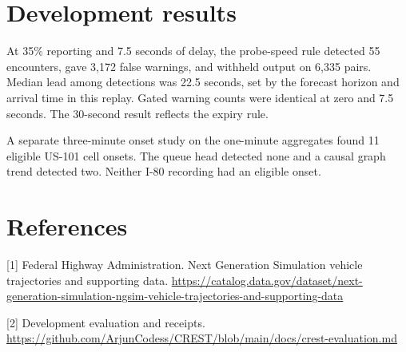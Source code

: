 \documentclass[conference]{IEEEtran}
\begin{document}
\section*{Development results}
At 35\% reporting and 7.5 seconds of delay, the probe-speed rule detected 55 encounters,
gave 3,172 false warnings, and withheld output on 6,335 pairs. Median lead among detections
was 22.5 seconds, set by the forecast horizon and arrival time in this replay. Gated warning
counts were identical at zero and 7.5 seconds. The 30-second result reflects the expiry
rule.

A separate three-minute onset study on the one-minute aggregates found 11 eligible US-101
cell onsets. The queue head detected none and a causal graph trend detected two.
Neither I-80 recording had an eligible onset.

\section*{References}
[1] Federal Highway Administration. Next Generation Simulation vehicle trajectories and
supporting data.
\url{https://catalog.data.gov/dataset/next-generation-simulation-ngsim-vehicle-trajectories-and-supporting-data}

[2] Development evaluation and receipts.
\url{https://github.com/ArjunCodess/CREST/blob/main/docs/crest-evaluation.md}
\end{document}
